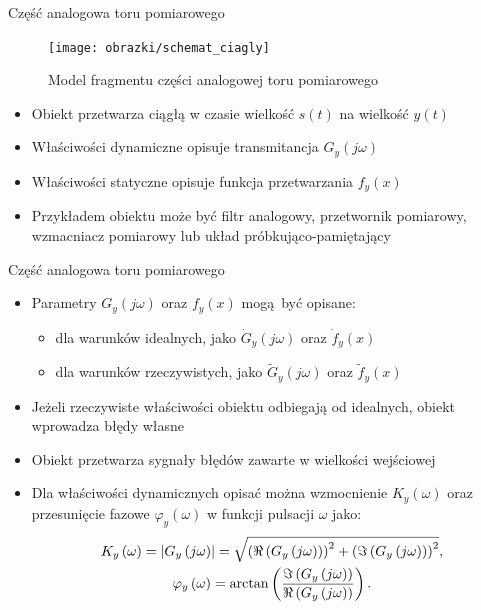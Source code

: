 \documentclass[12pt, polish, aspectratio = 169]{beamer}
\begin{document}
\begin{frame}{Część analogowa toru pomiarowego}
\begin{figure}
\texttt{[image: obrazki/schemat\_ciagly]}
\caption{Model fragmentu części analogowej toru pomiarowego}
\end{figure}
\begin{itemize}
\item Obiekt przetwarza ciągłą w czasie wielkość $s(t)$ na wielkość $y(t)$
\item Właściwości dynamiczne opisuje transmitancja $G_{y}(j\omega)$
\item Właściwości statyczne opisuje funkcja przetwarzania $f_{y}(x)$
\item Przykładem obiektu może być filtr analogowy, przetwornik pomiarowy, wzmacniacz pomiarowy lub układ próbkująco-pamiętający
\end{itemize}
\end{frame}

\begin{frame}{Część analogowa toru pomiarowego}
\begin{itemize}
\item Parametry $G_{y}(j\omega)$ oraz $f_{y}(x)$ mogą być opisane:
	\begin{itemize}
	\item dla warunków idealnych, jako $\dot{G}_{y}(j\omega)$ oraz $\dot{f}_{y}(x)$
	\item dla warunków rzeczywistych, jako $\tilde{G}_{y}(j\omega)$ oraz $\tilde{f}_{y}(x)$
	\end{itemize}
\item Jeżeli rzeczywiste właściwości obiektu odbiegają od idealnych, obiekt wprowadza błędy własne
\item Obiekt przetwarza sygnały błędów zawarte w wielkości wejściowej
\item Dla właściwości dynamicznych opisać można wzmocnienie $K_{y}(\omega)$ oraz przesunięcie fazowe $\varphi_{y}(\omega)$ w funkcji pulsacji $\omega$ jako:
\begin{gather}
K_{y} \left(\omega\right) = \left| G_{y} \left(j\omega\right) \right| =
	\sqrt{\left( \Re \left( G_{y} \left(j\omega\right) \right) \right)^{2} +
	\left( \Im \left( G_{y} \left(j\omega\right) \right) \right)^{2}}
\label{eq:mid_cont_amp}, \\
\varphi_{y} \left(\omega\right) = \arctan \left( \frac{\Im \left( G_{y} \left(j\omega\right) \right)}{\Re \left( G_{y} \left(j\omega\right) \right)} \right) \label{eq:mid_cont_phi}.
\end{gather}
\end{itemize}
\end{frame}
\end{document}
